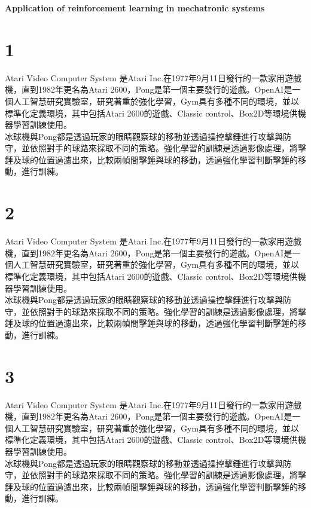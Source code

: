 \documentclass[14pt,a4paper]{report}  %
\begin{document}
\begin{center}
\fontsize{22pt}{22pt}\selectfont\textbf{Application of reinforcement
 learning in mechatronic systems}\\
\end{center}
\section{1}
Atari Video Computer System 是Atari Inc.在1977年9月11日發行的一款家用遊戲機，直到1982年更名為Atari 2600，Pong是第一個主要發行的遊戲。OpenAI是一個人工智慧研究實驗室，研究著重於強化學習，Gym具有多種不同的環境，並以標準化定義環境，其中包括Atari 2600的遊戲、Classic control、Box2D等環境供機器學習訓練使用。\\
\newpage
冰球機與Pong都是透過玩家的眼睛觀察球的移動並透過操控擊錘進行攻擊與防守，並依照對手的球路來採取不同的策略。強化學習的訓練是透過影像處理，將擊錘及球的位置過濾出來，比較兩幀間擊錘與球的移動，透過強化學習判斷擊錘的移動，進行訓練。\\
\newpage
\section{2}
Atari Video Computer System 是Atari Inc.在1977年9月11日發行的一款家用遊戲機，直到1982年更名為Atari 2600，Pong是第一個主要發行的遊戲。OpenAI是一個人工智慧研究實驗室，研究著重於強化學習，Gym具有多種不同的環境，並以標準化定義環境，其中包括Atari 2600的遊戲、Classic control、Box2D等環境供機器學習訓練使用。\\
\newpage
冰球機與Pong都是透過玩家的眼睛觀察球的移動並透過操控擊錘進行攻擊與防守，並依照對手的球路來採取不同的策略。強化學習的訓練是透過影像處理，將擊錘及球的位置過濾出來，比較兩幀間擊錘與球的移動，透過強化學習判斷擊錘的移動，進行訓練。\\
\newpage
\section{3}
Atari Video Computer System 是Atari Inc.在1977年9月11日發行的一款家用遊戲機，直到1982年更名為Atari 2600，Pong是第一個主要發行的遊戲。OpenAI是一個人工智慧研究實驗室，研究著重於強化學習，Gym具有多種不同的環境，並以標準化定義環境，其中包括Atari 2600的遊戲、Classic control、Box2D等環境供機器學習訓練使用。\\
\newpage
冰球機與Pong都是透過玩家的眼睛觀察球的移動並透過操控擊錘進行攻擊與防守，並依照對手的球路來採取不同的策略。強化學習的訓練是透過影像處理，將擊錘及球的位置過濾出來，比較兩幀間擊錘與球的移動，透過強化學習判斷擊錘的移動，進行訓練。\\
\newpage
\end{document}
